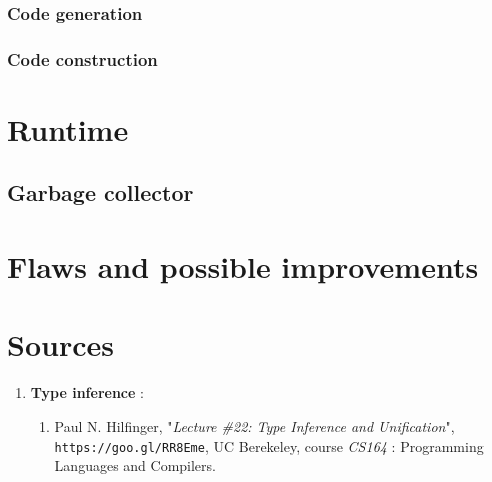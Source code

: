 \documentclass[a4paper,11pt]{article}
\begin{document}
\subsubsection{Code generation}
\subsubsection{Code construction}
\section{Runtime}
\subsection{Garbage collector}
\label{ssec:garabage_collector}
\section{Flaws and possible improvements}
\appendix
\section{Sources}
\begin{enumerate}
	\item \textbf{Type inference} :
	\begin{enumerate}
		\item\label{enum:inference_unification} Paul N. Hilfinger, "\textit{Lecture \#22: Type Inference and Unification}", \texttt{https://goo.gl/RR8Eme}, UC Berekeley, course \textit{CS164} : Programming Languages and Compilers.
	\end{enumerate}
\end{enumerate}
\end{document}
